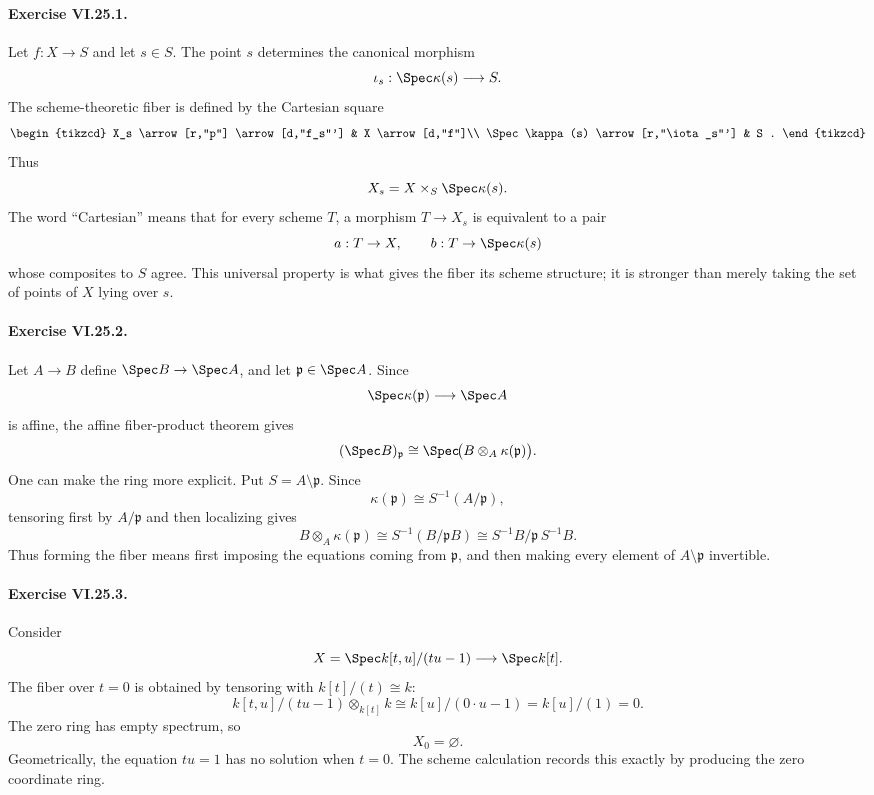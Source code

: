 \paragraph{Exercise VI.25.1.}
\begin{solution}
Let \(f:X\to S\) and let \(s\in S\).  The point \(s\) determines the canonical morphism
\[
\iota_s:\Spec\kappa(s)\longrightarrow S.
\]
The scheme-theoretic fiber is defined by the Cartesian square
\[
\begin{tikzcd}
X_s \arrow[r,"p"] \arrow[d,"f_s"'] & X \arrow[d,"f"]\\
\Spec\kappa(s) \arrow[r,"\iota_s"'] & S .
\end{tikzcd}
\]
Thus
\[
X_s=X\times_S\Spec\kappa(s).
\]
The word ``Cartesian'' means that for every scheme \(T\), a morphism \(T\to X_s\) is equivalent to a pair
\[
a:T\to X,\qquad b:T\to\Spec\kappa(s)
\]
whose composites to \(S\) agree.  This universal property is what gives the fiber its scheme structure; it is stronger than merely taking the set of points of \(X\) lying over \(s\).
\end{solution}

\paragraph{Exercise VI.25.2.}
\begin{solution}
Let \(A\to B\) define \(\Spec B\to\Spec A\), and let \(\mathfrak p\in\Spec A\).  Since
\[
\Spec\kappa(\mathfrak p)\longrightarrow\Spec A
\]
is affine, the affine fiber-product theorem gives
\[
(\Spec B)_{\mathfrak p}
\cong
\Spec\!\bigl(B\otimes_A\kappa(\mathfrak p)\bigr).
\]
One can make the ring more explicit.  Put \(S=A\setminus\mathfrak p\).  Since
\[
\kappa(\mathfrak p)\cong S^{-1}(A/\mathfrak p),
\]
tensoring first by \(A/\mathfrak p\) and then localizing gives
\[
B\otimes_A\kappa(\mathfrak p)
\cong
S^{-1}(B/\mathfrak p B)
\cong
S^{-1}B/\mathfrak p\,S^{-1}B.
\]
Thus forming the fiber means first imposing the equations coming from \(\mathfrak p\), and then making every element of \(A\setminus\mathfrak p\) invertible.
\end{solution}

\paragraph{Exercise VI.25.3.}
\begin{solution}
Consider
\[
X=\Spec k[t,u]/(tu-1)\longrightarrow\Spec k[t].
\]
The fiber over \(t=0\) is obtained by tensoring with \(k[t]/(t)\cong k\):
\[
k[t,u]/(tu-1)\otimes_{k[t]}k
\cong
k[u]/(0\cdot u-1)
=
k[u]/(1)
=
0.
\]
The zero ring has empty spectrum, so
\[
X_0=\varnothing.
\]
Geometrically, the equation \(tu=1\) has no solution when \(t=0\).  The scheme calculation records this exactly by producing the zero coordinate ring.
\end{solution}


